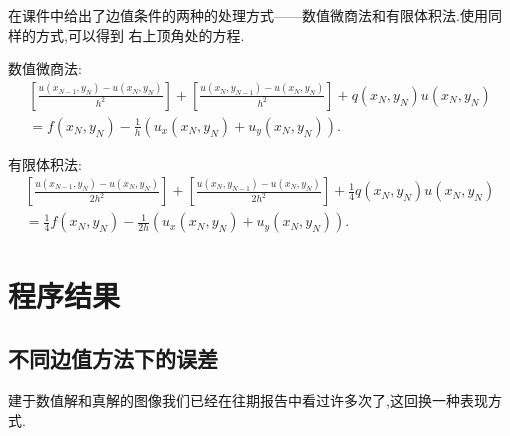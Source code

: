 \documentclass[11pt,reqno]{article}
\numberwithin{equation}{section}
\begin{document}
在课件中给出了边值条件的两种的处理方式——数值微商法和有限体积法.使用同样的方式,可以得到
右上顶角处的方程.

数值微商法:
\begin{equation}
	\begin{split}
	\left[\frac{u(x_{N-1},y_N)-u(x_N,y_N)}{h^2}\right]+
	\left[\frac{u(x_N,y_{N-1})-u(x_N,y_N)}{h^2}\right]
	+q(x_N,y_N)u(x_N,y_N)\\
	=f(x_N,y_N)-\frac{1}{h}\left(u_x(x_N,y_N)+u_y(x_N,y_N)\right).
	\end{split}
\end{equation}

有限体积法:
\begin{equation}
	\begin{split}
	\left[\frac{u(x_{N-1},y_N)-u(x_N,y_N)}{2h^2}\right]+
	\left[\frac{u(x_N,y_{N-1})-u(x_N,y_N)}{2h^2}\right]
	+\frac{1}{4}q(x_N,y_N)u(x_N,y_N)\\
	=\frac{1}{4}f(x_N,y_N)-\frac{1}{2h}\left(u_x(x_N,y_N)+u_y(x_N,y_N)\right).
	\end{split}
\end{equation}
\vspace{50pt}

\section{程序结果}

\subsection{不同边值方法下的误差}

建于数值解和真解的图像我们已经在往期报告中看过许多次了,这回换一种表现方式.
\end{document}

